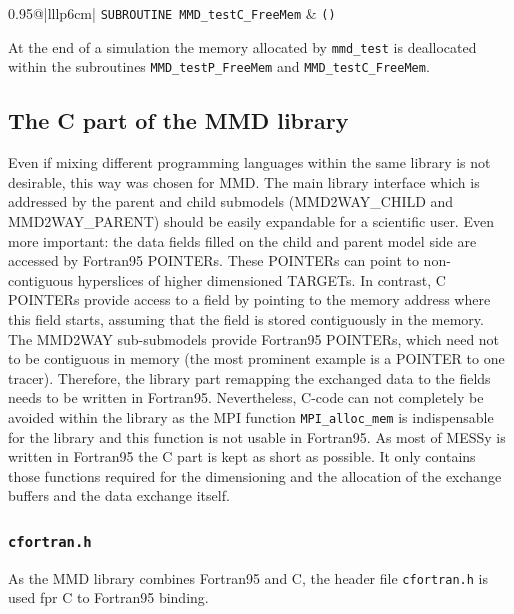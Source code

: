 \documentclass[twoside]{article}
\begin{document}
\begin{itemize}
\begin{tabular*}{0.95\textwidth}{@{\extracolsep\fill}|lllp{6cm}|}
\hline
{}
{\tt SUBROUTINE MMD\_testC\_FreeMem} &
{\tt ()}\\
\hline
\end{tabular*}

At the end of a simulation the memory allocated by \verb|mmd_test|
is deallocated within  the subroutines 
\verb|MMD_testP_FreeMem| and \verb|MMD_testC_FreeMem|.

\end{itemize}

\subsection{The C part of the MMD library}\label{sec:MMD-C}
Even if mixing different programming languages within the same library is not 
desirable, this way was chosen for MMD. The main library interface 
which is addressed by the parent and child submodels (MMD2WAY\_CHILD
and MMD2WAY\_PARENT) 
 should be easily expandable for a scientific user. Even more important: the
data fields filled on the child and parent model side are accessed by
Fortran95 {\footnotesize POINTER}s.  These {\footnotesize POINTER}s
can point to non-contiguous hyperslices of 
higher dimensioned {\footnotesize TARGETs}. 
 In contrast, C {\footnotesize POINTERs} provide access to a field by pointing 
to the memory address where this
field starts, assuming that the field is stored contiguously in the memory. 
The MMD2WAY sub-submodels provide Fortran95 {\footnotesize POINTERs},
which need not to be contiguous in memory (the most prominent example is a 
{\footnotesize POINTER} to one tracer). Therefore, the 
library part remapping the exchanged data to the fields 
needs to be written in Fortran95. Nevertheless, C-code can not completely be
avoided within the library as the  MPI function \verb|MPI_alloc_mem| is
indispensable for the library and this function is not usable in Fortran95.
As most of MESSy is written in Fortran95 the C part is kept as short as
 possible.
It only contains those functions required for the dimensioning and the 
allocation of the exchange buffers and the data exchange itself.

\subsubsection{{\tt cfortran.h}}
As the MMD library combines Fortran95 and C, the header file 
\verb|cfortran.h| is used fpr C to Fortran95 binding.
\end{document}
